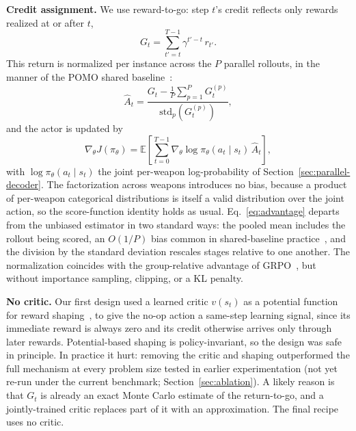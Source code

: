 \textbf{Credit assignment.} We use reward-to-go: step $t$'s credit reflects only rewards realized at or after $t$,
\begin{equation}
G_t = \sum_{t'=t}^{T-1} \gamma^{t'-t}\, r_{t'}.
\end{equation}
This return is normalized per instance across the $P$ parallel rollouts, in the manner of the POMO shared baseline~\cite{kwon2020pomo}:
\begin{equation}
\label{eq:advantage}
\hat{A}_t = \frac{G_t - \frac{1}{P}\sum_{p=1}^P G_t^{(p)}}{\text{std}_p\!\left(G_t^{(p)}\right)},
\end{equation}
and the actor is updated by
\begin{equation}
\label{eq:actor-gradient}
\nabla_\theta J(\pi_\theta) = \mathbb{E}\!\left[\sum_{t=0}^{T-1} \nabla_\theta \log \pi_\theta(a_t \mid s_t)\, \hat{A}_t\right],
\end{equation}
with $\log \pi_\theta(a_t\mid s_t)$ the joint per-weapon log-probability of Section~\ref{sec:parallel-decoder}. The factorization across weapons introduces no bias, because a product of per-weapon categorical distributions is itself a valid distribution over the joint action, so the score-function identity holds as usual. Eq.~\eqref{eq:advantage} departs from the unbiased estimator in two standard ways: the pooled mean includes the rollout being scored, an $O(1/P)$ bias common in shared-baseline practice~\cite{kwon2020pomo}, and the division by the standard deviation rescales stages relative to one another. The normalization coincides with the group-relative advantage of GRPO~\cite{shao2024deepseekmath}, but without importance sampling, clipping, or a KL penalty.

\textbf{No critic.} Our first design used a learned critic $v(s_t)$ as a potential function for reward shaping~\cite{ng1999shaping}, to give the no-op action a same-step learning signal, since its immediate reward is always zero and its credit otherwise arrives only through later rewards. Potential-based shaping is policy-invariant, so the design was safe in principle. In practice it hurt: removing the critic and shaping outperformed the full mechanism at every problem size tested in earlier experimentation (not yet re-run under the current benchmark; Section~\ref{sec:ablation}). A likely reason is that $G_t$ is already an exact Monte Carlo estimate of the return-to-go, and a jointly-trained critic replaces part of it with an approximation. The final recipe uses no critic.


